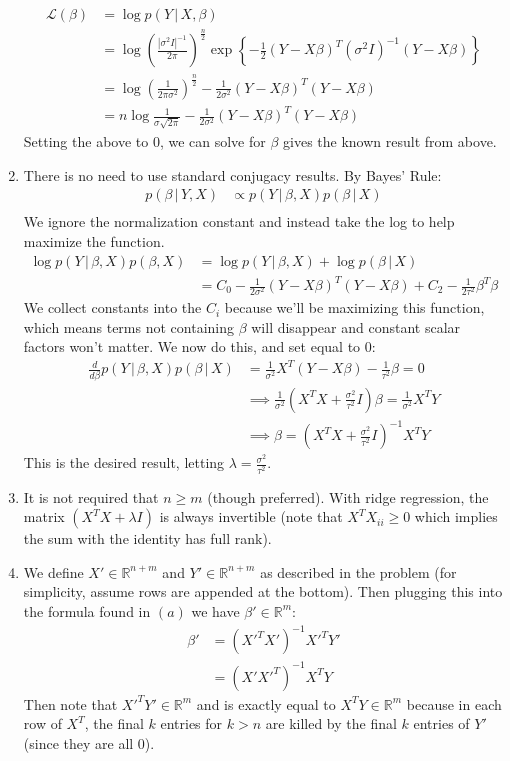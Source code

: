 \documentclass[submit]{harvardml}
\newcommand{\given}{\,|\,}
\theoremstyle{plain}
\begin{document}
\begin{enumerate}[label=(\alph*)]
\begin{align*}
\mathcal{L}(\beta) &= \log p(Y \given X, \beta) \\
&= \log \left(\frac{|\sigma^2 I|^{-1}}{2\pi}\right)^{\frac{n}{2}} \exp \left\{-\frac{1}{2} (Y - X\beta)^T(\sigma^2 I)^{-1}(Y-X\beta) \right\} \\
&= \log \left(\frac{1}{2\pi\sigma^2}\right)^{\frac{n}{2}} - \frac{1}{2\sigma^2}(Y-X\beta)^T(Y -X\beta) \\
&= n \log \frac{1}{\sigma\sqrt{2\pi}} - \frac{1}{2\sigma^2}(Y- X\beta)^T(Y - X\beta)
\end{align*}
Setting the above to $0$, we can solve for $\beta$ gives the known result from above.

\item There is no need to use standard conjugacy results. By Bayes' Rule:
\begin{align*}
p(\beta \given Y,X) &\propto p(Y \given \beta,X) p(\beta \given X) \\
\end{align*}
We ignore the normalization constant and instead take the log to help maximize the function.
\begin{align*}
\log p(Y \given \beta, X)p(\beta, X) &= \log p(Y \given \beta, X) + \log p(\beta \given X) \\
&= C_0 - \frac{1}{2\sigma^2}(Y - X\beta)^T(Y - X\beta) + C_2 - \frac{1}{2\tau^2}\beta^T\beta
\end{align*}
We collect constants into the $C_i$ because we'll be maximizing this function, which means terms not containing $\beta$ will disappear and constant scalar factors won't matter. We now do this, and set equal to $0$:
\begin{align*}
\frac{d}{d\beta} p(Y \given \beta,X)p(\beta \given X) &= \frac{1}{\sigma^2}X^T(Y - X\beta) - \frac{1}{\tau^2}\beta = 0\\
&\implies \frac{1}{\sigma^2}(X^TX + \frac{\sigma^2}{\tau^2}I)\beta = \frac{1}{\sigma^2}X^TY \\
&\implies \beta = (X^TX + \frac{\sigma^2}{\tau^2}I)^{-1}X^TY
\end{align*}
This is the desired result, letting $\lambda = \frac{\sigma^2}{\tau^2}$.

\item It is not required that $n \geq m$ (though preferred). With ridge regression, the matrix $(X^TX + \lambda I)$ is always invertible (note that $X^TX_{ii} \geq 0$ which implies the sum with the identity has full rank).
\item We define $X' \in \mathbb{R}^{n+m}$ and $Y' \in \mathbb{R}^{n+m}$ as described in the problem (for simplicity, assume rows are appended at the bottom). Then plugging this into the formula found in $(a)$ we have $\beta' \in \mathbb{R}^m$:
\begin{align*}
\beta' &= (X'^TX')^{-1}X'^TY' \\
&= (X'X'^T)^{-1}X^TY
\end{align*}
Then note that $X'^TY' \in \mathbb{R}^m$ and is exactly equal to $X^TY \in \mathbb{R}^m$ because in each row of $X^T$, the final $k$ entries for $k > n$  are killed by the final $k$ entries of $Y'$ (since they are all $0$).


\end{enumerate}
\end{document}
